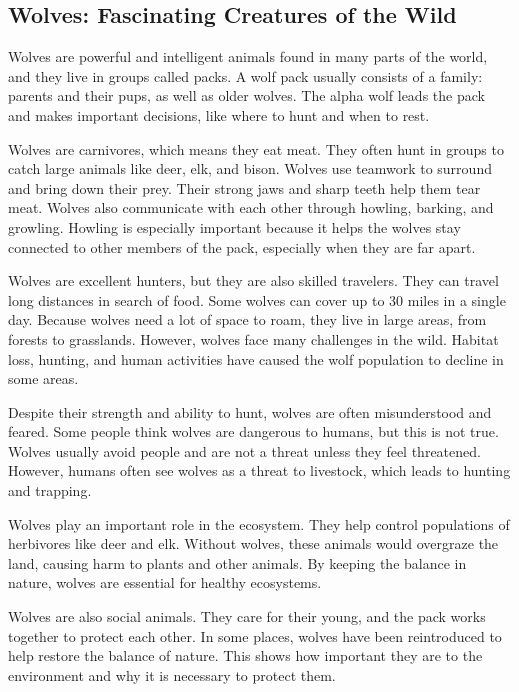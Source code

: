 \documentclass[12pt]{article}
\begin{document}
\onehalfspacing


\subsection*{Wolves: Fascinating Creatures of the Wild}

\begin{tcolorbox}[colframe=black!40, colback=gray!5]

\begin{spacing}{1.15}
        Wolves are powerful and intelligent animals found in many parts of the world, and they live in groups called packs. A wolf pack usually consists of a family: parents and their pups, as well as older wolves. The alpha wolf leads the pack and makes important decisions, like where to hunt and when to rest.

    Wolves are carnivores, which means they eat meat. They often hunt in groups to catch large animals like deer, elk, and bison. Wolves use teamwork to surround and bring down their prey. Their strong jaws and sharp teeth help them tear meat. Wolves also communicate with each other through howling, barking, and growling. Howling is especially important because it helps the wolves stay connected to other members of the pack, especially when they are far apart.

    Wolves are excellent hunters, but they are also skilled travelers. They can travel long distances in search of food. Some wolves can cover up to 30 miles in a single day. Because wolves need a lot of space to roam, they live in large areas, from forests to grasslands. However, wolves face many challenges in the wild. Habitat loss, hunting, and human activities have caused the wolf population to decline in some areas.

    Despite their strength and ability to hunt, wolves are often misunderstood and feared. Some people think wolves are dangerous to humans, but this is not true. Wolves usually avoid people and are not a threat unless they feel threatened. However, humans often see wolves as a threat to livestock, which leads to hunting and trapping.

    Wolves play an important role in the ecosystem. They help control populations of herbivores like deer and elk. Without wolves, these animals would overgraze the land, causing harm to plants and other animals. By keeping the balance in nature, wolves are essential for healthy ecosystems.

    Wolves are also social animals. They care for their young, and the pack works together to protect each other. In some places, wolves have been reintroduced to help restore the balance of nature. This shows how important they are to the environment and why it is necessary to protect them.


\end{spacing}
\end{tcolorbox}
\end{document}
